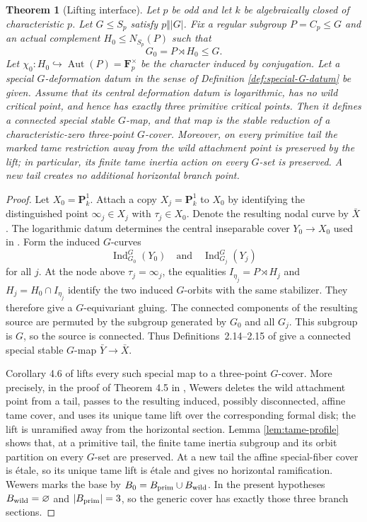 \documentclass[11pt]{amsart}
\theoremstyle{plain}
\newtheorem{theorem}{Theorem}[section]
\theoremstyle{definition}
\numberwithin{equation}{section}
\begin{document}
\begin{theorem}[Lifting interface]\label{prop:interface}
Let $p$ be odd and let $k$ be algebraically closed of characteristic $p$.
Let $G\leq S_p$ satisfy $p\Vert |G|$.  Fix a regular subgroup
$P=C_p\leq G$ and an actual complement $H_0\leq N_{S_p}(P)$ such that
\[
 G_0=P\rtimes H_0\leq G.
\]
Let $\chi_0:H_0\hookrightarrow\operatorname{Aut}(P)
=\mathbf F_p^\times$ be the character induced by conjugation.
Let a special $G$-deformation datum in the sense of Definition
\ref{def:special-G-datum} be given.  Assume that its central deformation
datum is logarithmic, has no wild critical point, and hence has exactly
three primitive critical points.  Then it defines a connected special
stable $G$-map, and that map is
the stable reduction of a characteristic-zero three-point $G$-cover.
Moreover, on every primitive tail the marked tame restriction away from the
wild attachment point is preserved by the lift; in particular, its finite
tame inertia action on every $G$-set is preserved.  A new tail creates no
additional horizontal branch point.
\end{theorem}

\begin{proof}
Let $X_0=\mathbf P^1_k$.  Attach a copy $X_j=\mathbf P^1_k$ to $X_0$ by
identifying the distinguished point $\infty_j\in X_j$ with
$\tau_j\in X_0$.  Denote the resulting nodal curve by $\bar X$.  The
logarithmic datum determines the central inseparable cover $Y_0\to X_0$
used in \cite[Definitions~2.14--2.15]{WewersThree}.  Form the induced
$G$-curves
\[
 \operatorname{Ind}_{G_0}^{G}(Y_0)
 \quad\text{and}\quad
 \operatorname{Ind}_{G_j}^{G}(Y_j)
\]
for all $j$.  At the node above $\tau_j=\infty_j$, the equalities
$I_{\eta_j}=P\rtimes H_j$ and $H_j=H_0\cap I_{\eta_j}$ identify the two
induced $G$-orbits with the same stabilizer.  They therefore give a
$G$-equivariant gluing.  The connected components of the resulting source
are permuted by the subgroup generated by $G_0$ and all $G_j$.  This subgroup
is $G$, so the source is connected.  Thus Definitions~2.14--2.15 of
\cite{WewersThree} give a connected special stable $G$-map
$\bar Y\to\bar X$.

Corollary 4.6 of \cite{WewersThree} lifts every such special map to a
three-point $G$-cover.  More precisely, in the proof of Theorem 4.5 in
\cite[Section 4.2.3]{WewersThree}, Wewers deletes the wild attachment point
from a tail, passes to the resulting induced, possibly disconnected, affine
tame cover, and uses its unique tame lift over the corresponding formal disk;
the lift is unramified away from the horizontal section.  Lemma
\ref{lem:tame-profile} shows that, at a primitive tail, the finite tame
inertia subgroup and its orbit partition on every $G$-set are preserved.  At
a new tail the affine special-fiber cover is \'etale, so its unique tame lift
is \'etale and gives no horizontal ramification.
Wewers marks the base by $B_0=B_{\rm prim}\cup B_{\rm wild}$.  In the
present hypotheses $B_{\rm wild}=\varnothing$ and $|B_{\rm prim}|=3$, so the
generic cover has exactly those three branch sections.
\end{proof}
\end{document}
